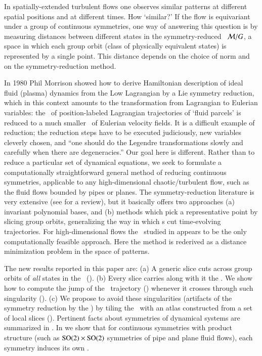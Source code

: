 \documentclass[preprint,12pt]{elsarticle} %
\begin{document}
In spatially-extended turbulent flows one observes similar patterns at
different spatial positions and at different times. How `similar?' If the
flow is equivariant under a group of continuous symmetries, one way of
answering this question is by measuring distances between different
states in the symmetry-reduced \statesp\ ${\cal M}/G$, a space in which
each group orbit (class of physically equivalent states) is represented
by a single point. This distance depends on the choice of norm and on
the symmetry-reduction method.

													\toCB
In 1980 Phil Morrison showed how to derive Hamiltonian
description of ideal fluid (plasma) dynamics from the Low
Lagrangian by a Lie symmetry reduction, which in this context
amounts to the transformation from Lagrangian to Eulerian variables: the
\statesp\ of position-labeled Lagrangian trajectories of `fluid parcels'
is reduced to a much smaller \statesp\ of Eulerian velocity
fields. It is a
difficult example of reduction; the reduction steps have to be
executed judiciously, new variables cleverly chosen, and ``one should do
the Legendre transformations slowly and carefully when there are
degeneracies.'' Our goal here is different. Rather than to
reduce a particular set of dynamical equations, we seek to formulate a
computationally straightforward general method of reducing continuous
symmetries, applicable to any high-dimensional chaotic/turbulent flow,
such as the fluid flows bounded by pipes or planes. The
symmetry-reduction literature is very extensive (see
 for a review), but it basically offers two
approaches (a) invariant polynomial bases, and (b) methods which pick a
representative point by slicing group orbits, generalizing the way in
which {\PoincSec}s cut time-evolving trajectories. For high-dimensional
flows the \mslices\ studied in 
appears to be the only computationally feasible approach. Here
the method is rederived as a distance minimization problem in the space
of patterns.

The new results reported in this paper are:
    (a) A generic slice cuts across group orbits of {\em all}
        states in the \statesp\ ().
    (b) Every slice carries along with it the {\sset}. We show how to
        compute the jump of the \reducedsp\ trajectory
         () whenever it crosses
        through such singularity  ().
    (c) We propose to avoid these singularities (artifacts of the symmetry
        reduction by the \mslices) by tiling the \statesp\ with an atlas
        constructed from a set of local slices  ().
Pertinent facts about symmetries of dynamical systems are summarized in
. In   we show that for
continuous symmetries with product structure (such as $\textrm{SO}(2) \times
\textrm{SO}(2)$ symmetries of pipe and plane fluid flows), each symmetry induces
its own {\sset}.
\end{document}

